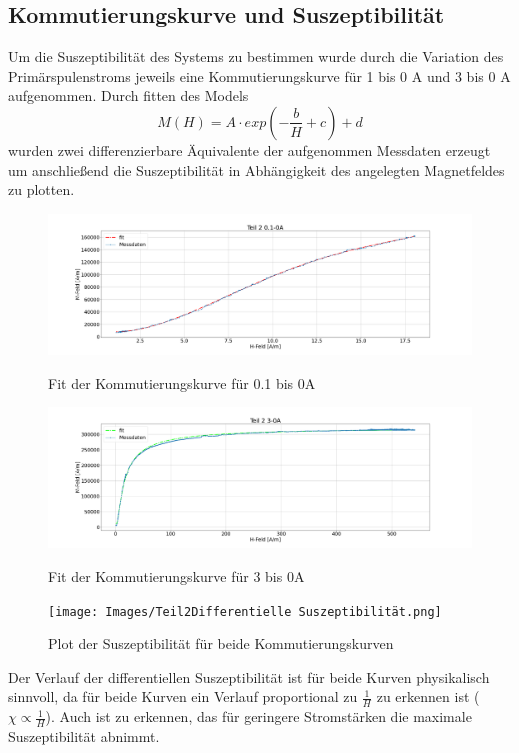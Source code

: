     \subsection{Kommutierungskurve und Suszeptibilität}
        Um die Suszeptibilität des Systems zu bestimmen wurde durch die Variation des Primärspulenstroms jeweils eine Kommutierungskurve für 1 bis 0 A und 3 bis 0 A aufgenommen.
        Durch fitten des Models 
        \begin{equation}
            M(H) = A \cdot exp(-\frac{b}{H} + c) + d
        \end{equation}
        wurden zwei differenzierbare Äquivalente der aufgenommen Messdaten erzeugt um anschließend die Suszeptibilität in Abhängigkeit des angelegten Magnetfeldes zu plotten.
        \begin{figure}[H]
            \centering
            \includegraphics[width=\textwidth]{Images/Teil2Teil 2 1-0A.png}
            \label{Teil2-1A}
            \caption{Fit der Kommutierungskurve für 0.1 bis 0A}
        \end{figure}
        \begin{figure}[H]
            \centering
            \includegraphics[width=\textwidth]{Images/Teil2Teil 2 3-0A.png}
            \label{Teil2-3A}
            \caption{Fit der Kommutierungskurve für 3 bis 0A}
        \end{figure}
        \begin{figure}[H]
            \centering
            \texttt{[image: Images/Teil2Differentielle Suszeptibilität.png]}
            \label{DiffSus}
            \caption{Plot der Suszeptibilität für beide Kommutierungskurven}
        \end{figure}
            Der Verlauf der differentiellen Suszeptibilität ist für beide Kurven physikalisch sinnvoll, da für beide Kurven ein Verlauf proportional zu $\frac{1}{H}$ zu erkennen ist ($\chi \propto \frac{1}{H}$). Auch ist zu erkennen,
            das für geringere Stromstärken die maximale Suszeptibilität abnimmt.
